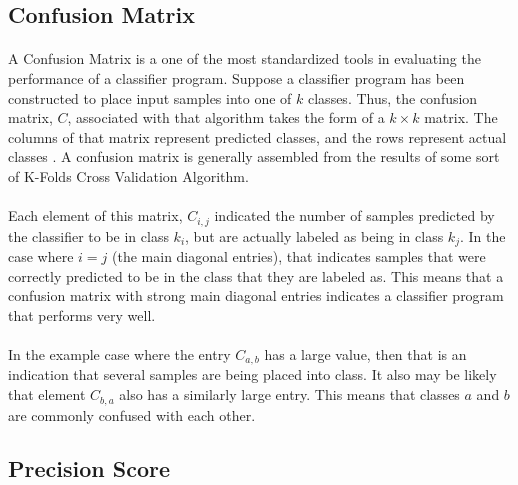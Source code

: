 \documentclass[12pt,letterpaper]{article}
\begin{document}

\subsection{Confusion Matrix}
\paragraph*{}A Confusion Matrix is a one of the most standardized tools in evaluating the performance of a classifier program. Suppose a classifier program has been constructed to place input samples into one of $k$ classes. Thus, the confusion matrix, $C$, associated with that algorithm takes the form of a $k \times k$ matrix. The columns of that matrix represent predicted classes, and the rows represent actual classes \cite{Geron}. A confusion matrix is generally assembled from the results of some sort of K-Folds Cross Validation Algorithm. 
\paragraph*{}Each element of this matrix, $C_{i,j}$ indicated the number of samples predicted by the classifier to be in class $k_i$, but are actually labeled as being in class $k_j$. In the case where $i = j$ (the main diagonal entries), that indicates samples that were correctly predicted to be in the class that they are labeled as. This means that a confusion matrix with strong main diagonal entries indicates a classifier program that performs very well. 
\paragraph*{}In the example case where the entry $C_{a,b}$ has a large value, then that is an indication that several samples are being placed into class. It also may be likely that element $C_{b,a}$ also has a similarly large entry. This means that classes $a$ and $b$ are commonly confused with each other. 


\subsection{Precision Score}
\end{document}
